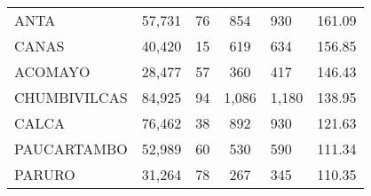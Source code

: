 \begin{tabular}{lrcclr}
	\cellcolor[HTML]{FFFF99}ANTA                                   & 57,731                                                         & 76                                                         & 854                  & 930                                                                 & 161.09                                                                       \\
	\cellcolor[HTML]{FFFF99}CANAS                                  & 40,420                                                         & 15                                                         & 619                  & 634                                                                 & 156.85                                                                       \\
	\cellcolor[HTML]{C6E0B4}ACOMAYO                                & 28,477                                                         & 57                                                         & 360                  & 417                                                                 & 146.43                                                                       \\
	\cellcolor[HTML]{C6E0B4}CHUMBIVILCAS                           & 84,925                                                         & 94                                                         & 1,086                & 1,180                                                               & 138.95                                                                       \\
	\cellcolor[HTML]{C6E0B4}CALCA                                  & 76,462                                                         & 38                                                         & 892                  & 930                                                                 & 121.63                                                                       \\
	\cellcolor[HTML]{C6E0B4}PAUCARTAMBO                            & 52,989                                                         & 60                                                         & 530                  & 590                                                                 & 111.34                                                                       \\
	\cellcolor[HTML]{C6E0B4}PARURO                                 & 31,264                                                         & 78                                                         & 267                  & 345                                                                 & 110.35                                                                       \\

\end{tabular}
